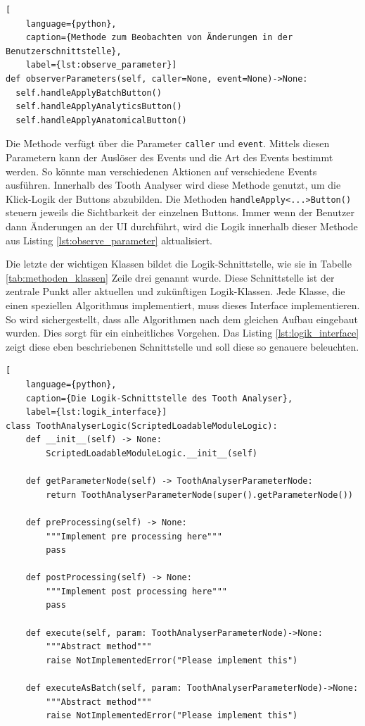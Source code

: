 \begin{lstlisting}[
    language={python},
    caption={Methode zum Beobachten von Änderungen in der Benutzerschnittstelle},
    label={lst:observe_parameter}]
def observerParameters(self, caller=None, event=None)->None:
  self.handleApplyBatchButton()
  self.handleApplyAnalyticsButton()
  self.handleApplyAnatomicalButton()
\end{lstlisting}

Die Methode verfügt über die Parameter \texttt{caller} und \texttt{event}. Mittels
diesen Parametern kann der Auslöser des Events und die Art des Events bestimmt werden.
So könnte man verschiedenen Aktionen auf verschiedene Events ausführen. Innerhalb
des Tooth Analyser wird diese Methode genutzt, um die Klick-Logik der Buttons
abzubilden. Die Methoden \texttt{handleApply<...>Button()} steuern jeweils die
Sichtbarkeit der einzelnen Buttons. Immer wenn der Benutzer dann Änderungen an der
UI durchführt, wird die Logik innerhalb dieser Methode aus Listing
\ref{lst:observe_parameter} aktualisiert.

Die letzte der wichtigen Klassen bildet die Logik-Schnittstelle, wie sie in Tabelle
\ref{tab:methoden_klassen} Zeile drei genannt wurde. Diese Schnittstelle ist der
zentrale Punkt aller aktuellen und zukünftigen Logik-Klassen. Jede Klasse, die
einen speziellen Algorithmus implementiert, muss dieses Interface implementieren.
So wird sichergestellt, dass alle Algorithmen nach dem gleichen Aufbau eingebaut
wurden. Dies sorgt für ein einheitliches Vorgehen. Das Listing \ref{lst:logik_interface}
zeigt diese eben beschriebenen Schnittstelle und soll diese so genauere beleuchten.

\pagebreak

\begin{lstlisting}[
    language={python},
    caption={Die Logik-Schnittstelle des Tooth Analyser},
    label={lst:logik_interface}]
class ToothAnalyserLogic(ScriptedLoadableModuleLogic):
    def __init__(self) -> None:
        ScriptedLoadableModuleLogic.__init__(self)

    def getParameterNode(self) -> ToothAnalyserParameterNode:
        return ToothAnalyserParameterNode(super().getParameterNode())

    def preProcessing(self) -> None:
        """Implement pre processing here"""
        pass

    def postProcessing(self) -> None:
        """Implement post processing here"""
        pass

    def execute(self, param: ToothAnalyserParameterNode)->None:
        """Abstract method"""
        raise NotImplementedError("Please implement this")

    def executeAsBatch(self, param: ToothAnalyserParameterNode)->None:
        """Abstract method"""
        raise NotImplementedError("Please implement this")
\end{lstlisting}

